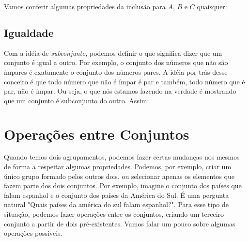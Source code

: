 Vamos conferir algumas propriedades da inclusão para $A$, $B$ e $C$ quaisquer: 


\subsection{Igualdade}
Com a idéia de \emph{subconjunto}, podemos definir o que significa dizer que um conjunto é igual a outro. Por exemplo, o conjunto dos números que não são ímpares é exatamente o conjunto dos números pares. A idéia por trás desse conceito é que todo número que não é ímpar é par e também, todo número que é par, não é ímpar. Ou seja, o que nós estamos fazendo na verdade é mostrando que um conjunto é subconjunto do outro. Assim:


\section{Operações entre Conjuntos}
Quando temos dois agrupamentos, podemos fazer certas mudanças nos mesmos de forma a respeitar algumas propriedades. Podemos, por exemplo, criar um único grupo formado pelos outros dois, ou selecionar apenas os elementos que fazem parte dos dois conjuntos. Por exemplo, imagine o conjunto dos países que falam espanhol e o conjunto dos países da América do Sul. É uma pergunta natural "Quais países da américa do sul falam espanhol?". Para esse tipo de situação, podemos fazer operações entre os conjuntos, criando um terceiro conjunto a partir de dois pré-existentes. Vamos falar um pouco sobre algumas operações possíveis.
